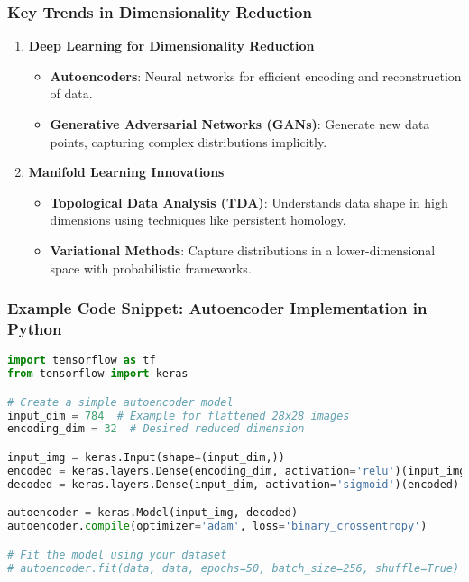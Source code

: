 \documentclass[aspectratio=169]{beamer}
\begin{document}
\begin{frame}
    \frametitle{Key Trends in Dimensionality Reduction}
    \begin{enumerate}
        \item \textbf{Deep Learning for Dimensionality Reduction}
        \begin{itemize}
            \item \textbf{Autoencoders}: Neural networks for efficient encoding and reconstruction of data.
            \item \textbf{Generative Adversarial Networks (GANs)}: Generate new data points, capturing complex distributions implicitly.
        \end{itemize}

        \item \textbf{Manifold Learning Innovations}
        \begin{itemize}
            \item \textbf{Topological Data Analysis (TDA)}: Understands data shape in high dimensions using techniques like persistent homology.
            \item \textbf{Variational Methods}: Capture distributions in a lower-dimensional space with probabilistic frameworks.
        \end{itemize}
    \end{enumerate}
\end{frame}

\begin{frame}[fragile]
    \frametitle{Example Code Snippet: Autoencoder Implementation in Python}
    \begin{lstlisting}[language=Python]
import tensorflow as tf
from tensorflow import keras

# Create a simple autoencoder model
input_dim = 784  # Example for flattened 28x28 images
encoding_dim = 32  # Desired reduced dimension

input_img = keras.Input(shape=(input_dim,))
encoded = keras.layers.Dense(encoding_dim, activation='relu')(input_img)
decoded = keras.layers.Dense(input_dim, activation='sigmoid')(encoded)

autoencoder = keras.Model(input_img, decoded)
autoencoder.compile(optimizer='adam', loss='binary_crossentropy')

# Fit the model using your dataset
# autoencoder.fit(data, data, epochs=50, batch_size=256, shuffle=True)
    \end{lstlisting}
\end{frame}
\end{document}
